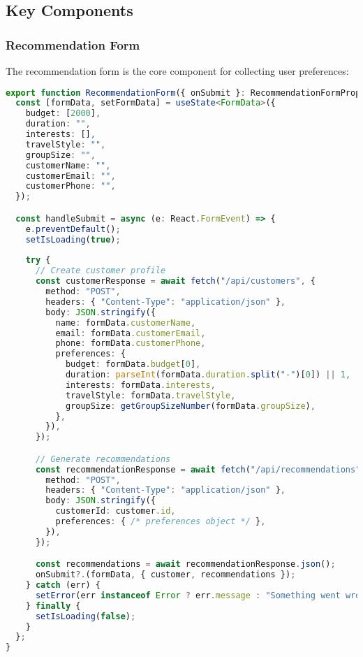 \documentclass[12pt,a4paper]{article}
\begin{document}
\subsection{Key Components}

\subsubsection{Recommendation Form}
The recommendation form is the core component for collecting user preferences:

\begin{lstlisting}[language=typescript, caption=Recommendation Form Implementation]
export function RecommendationForm({ onSubmit }: RecommendationFormProps) {
  const [formData, setFormData] = useState<FormData>({
    budget: [2000],
    duration: "",
    interests: [],
    travelStyle: "",
    groupSize: "",
    customerName: "",
    customerEmail: "",
    customerPhone: "",
  });

  const handleSubmit = async (e: React.FormEvent) => {
    e.preventDefault();
    setIsLoading(true);
    
    try {
      // Create customer profile
      const customerResponse = await fetch("/api/customers", {
        method: "POST",
        headers: { "Content-Type": "application/json" },
        body: JSON.stringify({
          name: formData.customerName,
          email: formData.customerEmail,
          phone: formData.customerPhone,
          preferences: {
            budget: formData.budget[0],
            duration: parseInt(formData.duration.split("-")[0]) || 1,
            interests: formData.interests,
            travelStyle: formData.travelStyle,
            groupSize: getGroupSizeNumber(formData.groupSize),
          },
        }),
      });

      // Generate recommendations
      const recommendationResponse = await fetch("/api/recommendations", {
        method: "POST",
        headers: { "Content-Type": "application/json" },
        body: JSON.stringify({
          customerId: customer.id,
          preferences: { /* preferences object */ },
        }),
      });

      const recommendations = await recommendationResponse.json();
      onSubmit?.(formData, { customer, recommendations });
    } catch (err) {
      setError(err instanceof Error ? err.message : "Something went wrong");
    } finally {
      setIsLoading(false);
    }
  };
}
\end{lstlisting}
\end{document}
